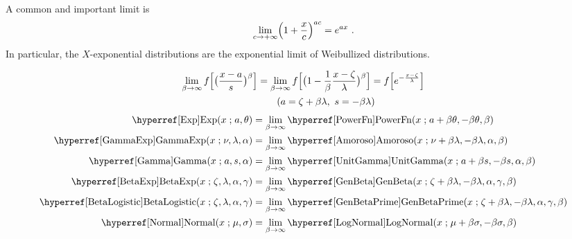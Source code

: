 

\clearpage
{}
\label{sec:Limits}

\label{sec:Limits:exp}
A common and important limit is 
\[
\lim_{c\rightarrow+\infty} \Left(1 + \frac{x}{c} \Right)^{a c} = e^{a x} \ . \checked
\notag
\]
In particular, the $X$-exponential distributions are the exponential limit of Weibullized distributions.

\begin{align*}
\lim_{\beta\rightarrow\infty} f\Bigl[ \bigl(\frac{x-a}{s}\bigr)^{\beta} \Bigr]
&= \lim_{\beta\rightarrow \infty} f\Bigl[\bigl(1 - \frac{1}{\beta} \frac{x-\pLoc }{ \pScale}\bigr)^{\beta}  \Bigr] =  f\Bigl[ e^{-\frac{x-\pLoc}{\pScale}} \Bigr] \checked
\\ & \qquad (a = \pLoc + \beta\pScale, \ s = - \beta \pScale) 
\checked
\end{align*}
\begin{align*}
\opr{Exp}(x\given a,\theta) &=  \lim_{\beta\rightarrow\infty} \opr{PowerFn} (x\given a+\beta\theta,-\beta\theta,\beta)
\checked
\\
\opr{GammaExp}(x\given \nu, \lambda, \alpha) &=  \lim_{\beta\rightarrow\infty} \opr{Amoroso}(x\given \nu+\beta \lambda,-\beta \lambda, \alpha,\beta)
\checked
\\
\opr{Gamma}(x\given a,s,\alpha) &= \lim_{\beta\rightarrow\infty} \opr{UnitGamma}(x\given a+\beta s,-\beta s, \alpha,\beta) 
\checked
\\
\opr{BetaExp}(x\given \pLoc, \pScale, \alpha, \gamma) 
& = \lim_{\beta\rightarrow\infty } \opr{GenBeta}(x\given \pLoc+\beta\lambda, -\beta\pScale, \alpha, \gamma, \beta) 
\\
  \opr{BetaLogistic}(x\given \pLoc, \pScale, \alpha, \gamma)  &=
 \lim_{\beta\rightarrow\infty}  \opr{GenBetaPrime}(x\given \pLoc+\beta\pScale, -\beta \pScale, \alpha, \gamma, \beta)  
\checked
\\
\opr{Normal}(x\given \mu, \sigma) & =   \lim_{\beta\rightarrow\infty} \opr{LogNormal}(x\given \mu + \beta\sigma, -\beta\sigma, \beta) \checked
\end{align*}



